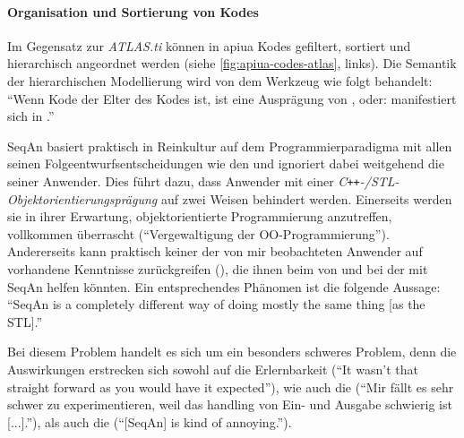 \documentclass[11pt,a4paper]{book}
\begin{document}
\paragraph{Organisation und Sortierung von Kodes}
Im Gegensatz zur \textit{ATLAS.ti} können in \gls{apiua} Kodes gefiltert, sortiert und hierarchisch angeordnet werden (siehe \autoref{fig:apiua-codes-atlas}, links). Die Semantik der hierarchischen Modellierung wird von dem Werkzeug wie folgt behandelt: ``Wenn Kode  der Elter des Kodes  ist, ist  eine Ausprägung von , oder:  manifestiert sich in .''

\clearpage

SeqAn basiert praktisch in Reinkultur auf dem Programmierparadigma  mit allen seinen Folgeentwurfsentscheidungen wie den  und ignoriert dabei weitgehend die  seiner Anwender. Dies führt dazu, dass Anwender mit einer \textit{C\texttt{++}-/STL-Objektorientierungsprägung} auf zwei Weisen behindert werden. Einerseits werden sie in ihrer Erwartung, objektorientierte Programmierung anzutreffen, vollkommen überrascht (``Vergewaltigung der OO-Programmierung''). Andererseits kann praktisch keiner der von mir beobachteten Anwender auf vorhandene Kenntnisse zurückgreifen (), die ihnen beim  von und bei der  mit SeqAn helfen könnten. Ein entsprechendes Phänomen ist die folgende Aussage: ``SeqAn is a completely different way of doing mostly the same thing [as the STL].''
     
     Bei diesem Problem handelt es sich um ein besonders schweres Problem, denn die Auswirkungen erstrecken sich sowohl auf die Erlernbarkeit (``It wasn't that straight forward as you would have it expected''), wie auch die  (``Mir fällt es sehr schwer zu experimentieren, weil das handling von Ein- und Ausgabe schwierig ist [...].''), als auch die  (``[SeqAn] is kind of annoying.'').
     
\end{document}
